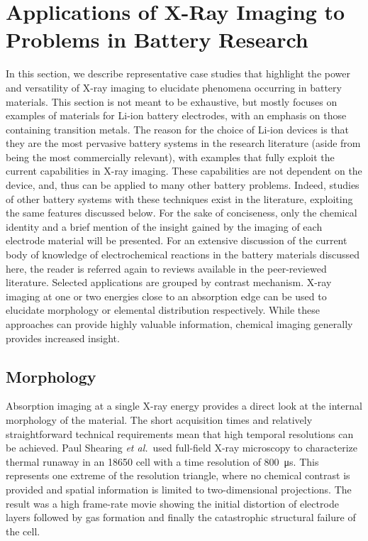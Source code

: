 \documentclass[journal=cmatex,manuscript=perspective]{achemso}
\begin{document}
\section{Applications of X-Ray Imaging to Problems in Battery Research}

In this section, we describe representative case studies that
highlight the power and versatility of X-ray imaging to elucidate
phenomena occurring in battery materials. This section is not meant to
be exhaustive, but mostly focuses on examples of materials for Li-ion
battery electrodes, with an emphasis on those containing transition
metals. The reason for the choice of Li-ion devices is that they are
the most pervasive battery systems in the research literature (aside
from being the most commercially relevant), with examples that fully
exploit the current capabilities in X-ray imaging. These capabilities
are not dependent on the device, and, thus can be applied to many
other battery problems. Indeed, studies of other battery systems with
these techniques exist in the literature, exploiting the same features
discussed below. For the sake of conciseness, only the chemical
identity and a brief mention of the insight gained by the imaging of
each electrode material will be presented. For an extensive discussion
of the current body of knowledge of electrochemical reactions in the
battery materials discussed here, the reader is referred again to
reviews available in the peer-reviewed
literature\cite{whittingham2014, balogun2016}. Selected applications
are grouped by contrast mechanism. X-ray imaging at one or two
energies close to an absorption edge can be used to elucidate
morphology or elemental distribution respectively. While these
approaches can provide highly valuable information, chemical imaging
generally provides increased insight.

\subsection{Morphology}

Absorption imaging at a single X-ray energy provides a direct look at
the internal morphology of the material. The short acquisition times
and relatively straightforward technical requirements mean that high
temporal resolutions can be achieved. Paul Shearing \emph{et
  al.}\ used full-field X-ray microscopy to characterize thermal
runaway in an 18650 cell with a time resolution of
\SI{800}{\micro\second}\cite{shearing2015}. This represents one
extreme of the resolution triangle, where no chemical contrast is
provided and spatial information is limited to two-dimensional
projections. The result was a high frame-rate movie showing the
initial distortion of electrode layers followed by gas formation and
finally the catastrophic structural failure of the cell.
\end{document}
